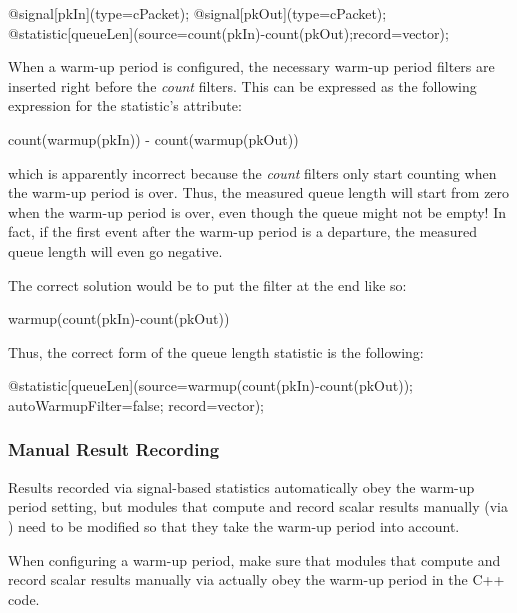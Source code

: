 \begin{ned}
@signal[pkIn](type=cPacket);
@signal[pkOut](type=cPacket);
@statistic[queueLen](source=count(pkIn)-count(pkOut);record=vector);
\end{ned}

When a warm-up period is configured, the necessary warm-up period filters are
inserted right before the \textit{count} filters. This can be expressed as the
following expression for the statistic's  attribute:

\begin{ned}
count(warmup(pkIn)) - count(warmup(pkOut))
\end{ned}

which is apparently incorrect because the \textit{count} filters only start
counting when the warm-up period is over. Thus, the measured queue length will
start from zero when the warm-up period is over, even though the queue might not
be empty! In fact, if the first event after the warm-up period is a departure,
the measured queue length will even go negative.

The correct solution would be to put the  filter at the end like so:

\begin{ned}
warmup(count(pkIn)-count(pkOut))
\end{ned}

Thus, the correct form of the queue length statistic is the following:

\begin{ned}
@statistic[queueLen](source=warmup(count(pkIn)-count(pkOut));
                     autoWarmupFilter=false;
                     record=vector);
\end{ned}


\subsubsection{Manual Result Recording}
\label{sec:ana-sim:warmup-period-manual-result-recording}

Results recorded via signal-based statistics automatically obey the warm-up
period setting, but modules that compute and record scalar results manually (via
) need to be modified so that they take the warm-up period
into account.

\begin{note}
When configuring a warm-up period, make sure that modules that compute and
record scalar results manually via  actually obey the
warm-up period in the C++ code.
\end{note}


